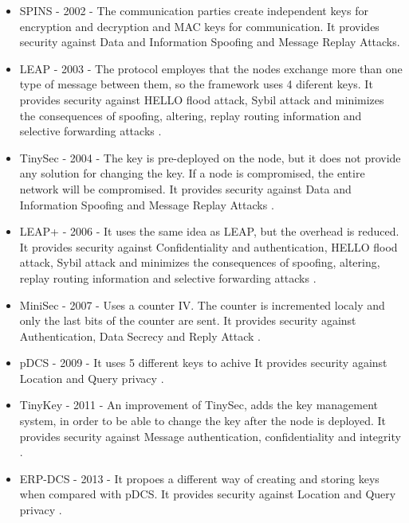 \begin{itemize}

\item SPINS - 2002 - The communication parties create independent keys for encryption and decryption
and MAC keys for communication. It provides security against Data and Information Spoofing and Message Replay Attacks\cite{perrig2002spins}.

\item LEAP - 2003 - The protocol employes that the nodes exchange more than one type of message between them, so the framework uses 4 diferent keys. It provides security against HELLO flood attack, Sybil attack and minimizes the consequences of spoofing, altering, replay routing information and selective forwarding attacks \cite{zhu2006leap+}.

\item TinySec - 2004 - The key is pre-deployed on the node, but it does not provide any solution for changing the key. If a node is compromised, the entire network will be compromised. It provides security against Data and Information Spoofing and Message Replay Attacks \cite{karlof2004tinysec}.

\item LEAP+ - 2006 - It uses the same idea as LEAP, but the overhead is reduced. It provides security against Confidentiality and authentication, HELLO flood attack, Sybil attack and minimizes the consequences of spoofing, altering, replay routing information and selective forwarding attacks \cite{zhu2006leap+}.
 
\item MiniSec - 2007 - Uses a counter IV. The counter is incremented localy and only the last bits of the counter are sent. It provides security against Authentication, Data Secrecy and Reply Attack \cite{luk2007minisec}.

\item pDCS - 2009 - It uses 5 different keys to achive  It provides security against Location and Query privacy \cite{shao2009pdcs}.

\item TinyKey - 2011 - An improvement of TinySec, adds the key management system, in order to be able to change the key after the node is deployed. It provides security against Message authentication, confidentiality and integrity \cite{doriguzzi2011tinykey}.

\item ERP-DCS - 2013 - It propoes a different way of creating and storing keys when compared with pDCS. It provides security against Location and Query privacy \cite{huang2013efficient}.

\end{itemize}
